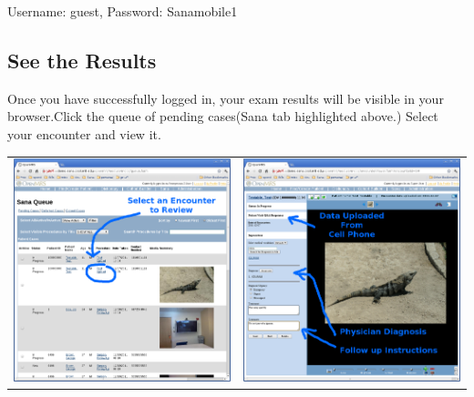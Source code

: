 \documentclass[a4paper,10pt]{article}
\begin{document}
Username: guest, Password: Sanamobile1

\subsection{See the Results}
\noindent Once you have successfully logged in, your exam results will be 
visible in your browser.Click the queue of pending cases(Sana tab highlighted 
above.) Select your encounter and view it.

\begin{flushleft}
\begin{tabular}{ c c }
\includegraphics[scale=0.25,keepaspectratio=true]{openmrs_sana_queue.png}
&\includegraphics[scale=0.25,keepaspectratio=true]{openmrs_sana_encounter.png}

\end{tabular}
\end{flushleft}
\end{document}
